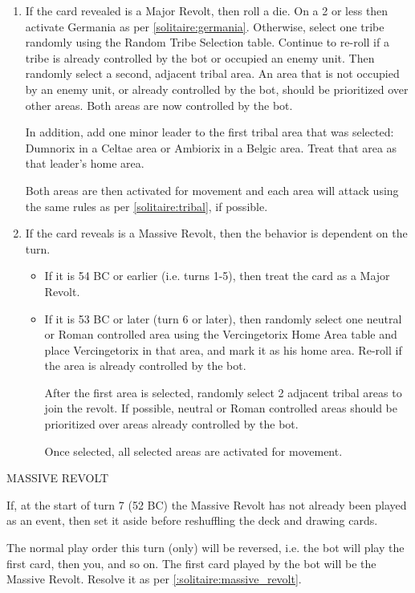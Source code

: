 \begin{enumerate}
\begin{enumerate}[leftmargin=0in]
    \item If the card revealed is a Major Revolt, then roll a die. On a 2 or less then activate Germania as per \ref{solitaire:germania}. Otherwise, select one tribe randomly using the Random Tribe Selection table. Continue to re-roll if a tribe is already controlled by the bot or occupied an enemy unit. Then randomly select a second, adjacent tribal area. An area that is not occupied by an enemy unit, or already controlled by the bot, should be prioritized over other areas. Both areas are now controlled by the bot.

    In addition, add one minor leader to the first tribal area that was selected: Dumnorix in a Celtae area or Ambiorix in a Belgic area. Treat that area as that leader's home area.

    Both areas are then activated for movement and each area will attack using the same rules as per \ref{solitaire:tribal}, if possible.

    \item If the card reveals is a Massive Revolt, then the behavior is dependent on the turn.
    \begin{itemize}
      \item If it is 54 BC or earlier (i.e. turns 1-5), then treat the card as a Major Revolt.
      \item \label{:solitaire:massive_revolt}If it is 53 BC or later (turn 6 or later), then randomly select one neutral or Roman controlled area using the Vercingetorix Home Area table and place Vercingetorix in that area, and mark it as his home area. Re-roll if the area is already controlled by the bot.

      After the first area is selected, randomly select 2 adjacent tribal areas to join the revolt. If possible, neutral or Roman controlled areas should be prioritized over areas already controlled by the bot.

      Once selected, all selected areas are activated for movement.
    \end{itemize}
  \end{enumerate}
\end{enumerate}

MASSIVE REVOLT

If, at the start of turn 7 (52 BC) the Massive Revolt has not already been played as an event, then set it aside before reshuffling the deck and drawing cards.

The normal play order this turn (only) will be reversed, i.e. the bot will play the first card, then you, and so on. The first card played by the bot will be the Massive Revolt. Resolve it as per \ref{:solitaire:massive_revolt}.


